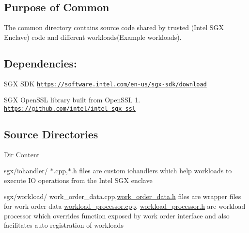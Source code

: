 \subsection*{Purpose of Common }

The common directory contains source code shared by trusted (Intel S\+GX Enclave) code and different workloads(\+Example workloads).

\subsection*{Dependencies\+: }


\begin{DoxyEnumerate}
\item S\+GX S\+DK \href{https://software.intel.com/en-us/sgx-sdk/download}{\tt https\+://software.\+intel.\+com/en-\/us/sgx-\/sdk/download}
\item S\+GX Open\+S\+SL library built from Open\+S\+SL 1. \href{https://github.com/intel/intel-sgx-ssl}{\tt https\+://github.\+com/intel/intel-\/sgx-\/ssl}
\end{DoxyEnumerate}

\subsection*{Source Directories }

Dir Content 

 {\ttfamily sgx/iohandler/} $\ast$.cpp,$\ast$.h files are custom iohandlers which help workloads to execute IO operations from the Intel S\+GX enclave

{\ttfamily sgx/workload/} work\+\_\+order\+\_\+data.\+cpp,\hyperlink{work__order__data_8h}{work\+\_\+order\+\_\+data.\+h} files are wrapper files for work order data \hyperlink{workload__processor_8cpp}{workload\+\_\+processor.\+cpp}, \hyperlink{workload__processor_8h}{workload\+\_\+processor.\+h} are workload processor which overrides function exposed by work order interface and also facilitates auto registration of workloads 